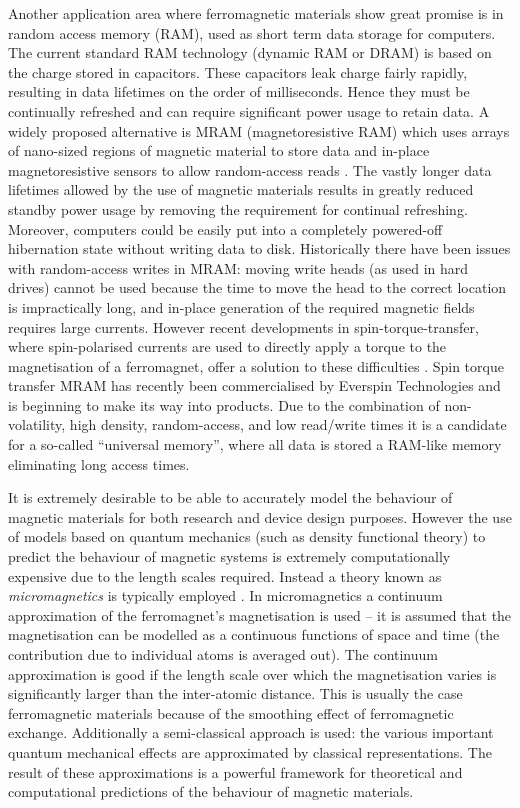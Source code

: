 Another application area where ferromagnetic materials show great promise is in random access memory (RAM), used as short term data storage for computers.
The current standard RAM technology (dynamic RAM or DRAM) is based on the charge stored in capacitors.
These capacitors leak charge fairly rapidly, resulting in data lifetimes on the order of milliseconds.
Hence they must be continually refreshed and can require significant power usage to retain data.
A widely proposed alternative is MRAM (magnetoresistive RAM) which uses arrays of nano-sized regions of magnetic material to store data and in-place magnetoresistive sensors to allow random-access reads \cite[Sec. 14.4]{Kronmuller1997}.
The vastly longer data lifetimes allowed by the use of magnetic materials results in greatly reduced standby power usage by removing the requirement for continual refreshing.
Moreover, computers could be easily put into a completely powered-off hibernation state without writing data to disk.
Historically there have been issues with random-access writes in MRAM: moving write heads (as used in hard drives) cannot be used because the time to move the head to the correct location is impractically long, and in-place generation of the required magnetic fields requires large currents.
However recent developments in spin-torque-transfer, where spin-polarised currents are used to directly apply a torque to the magnetisation of a ferromagnet, offer a solution to these difficulties \cite{Apalkov2013}.
Spin torque transfer MRAM has recently been commercialised by Everspin Technologies \cite{everspin} and is beginning to make its way into products.
Due to the combination of non-volatility, high density, random-access, and low read/write times it is a candidate for a so-called ``universal memory'', where all data is stored a RAM-like memory eliminating long access times.


It is extremely desirable to be able to accurately model the behaviour of magnetic materials for both research and device design purposes.
However the use of models based on quantum mechanics (such as density functional theory) to predict the behaviour of magnetic systems is extremely computationally expensive due to the length scales required.
Instead a theory known as \emph{micromagnetics} is typically employed \cite{Aharoni1996}.
In micromagnetics a continuum approximation of the ferromagnet's magnetisation is used -- it is  assumed that the magnetisation can be modelled as a continuous functions of space and time (\ie the contribution due to individual atoms is averaged out).
The continuum approximation is good if the length scale over which the magnetisation varies is significantly larger than the inter-atomic distance.
This is usually the case ferromagnetic materials because of the smoothing effect of ferromagnetic exchange.
Additionally a semi-classical approach is used: the various important quantum mechanical effects are approximated by classical representations.
The result of these approximations is a powerful framework for theoretical and computational predictions of the behaviour of magnetic materials.

